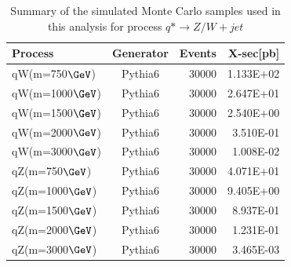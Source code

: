 \begin{table}[htb]
\begin{center}
\begin{tabular}{ |l|c|r|r| }
\hline
Process           & Generator& Events & X-sec[pb] \\
\hline
qW(m=750$\GeVcc$) &Pythia6   &30000   &1.133E+02  \\
qW(m=1000$\GeVcc$)&Pythia6   &30000   &2.647E+01  \\
qW(m=1500$\GeVcc$)&Pythia6   &30000   &2.540E+00  \\
qW(m=2000$\GeVcc$)&Pythia6   &30000   &3.510E-01  \\
qW(m=3000$\GeVcc$)&Pythia6   &30000   &1.008E-02  \\

qZ(m=750$\GeVcc$) &Pythia6   &30000   &4.071E+01  \\
qZ(m=1000$\GeVcc$)&Pythia6   &30000   &9.405E+00  \\
qZ(m=1500$\GeVcc$)&Pythia6   &30000   &8.937E-01  \\
qZ(m=2000$\GeVcc$)&Pythia6   &30000   &1.231E-01  \\
qZ(m=3000$\GeVcc$)&Pythia6   &30000   &3.465E-03  \\
\hline
\end{tabular}
\end{center}
\caption{Summary of the simulated Monte Carlo samples used in this analysis for process
 $q* \to Z/W + jet$}
\label{table:singletag}
\end{table}


